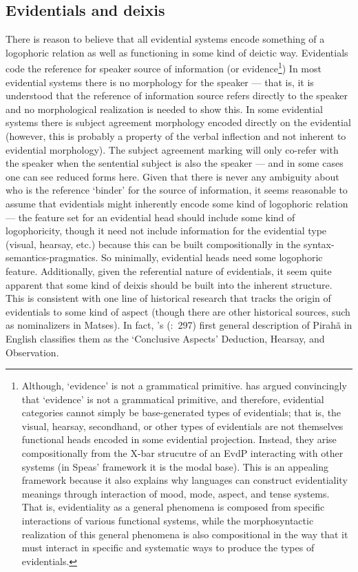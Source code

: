 \documentclass[11pt]{article}
\newcommand{\pgposscitet}[2]{\citeauthor{#1}'s (\citeyear{#1}:~#2)}
\begin{document}
\subsection{Evidentials and deixis} 
There is reason to believe that all evidential systems encode something of a logophoric relation as well as functioning in some kind of deictic way. Evidentials code the reference for speaker source of information (or evidence\footnote{Although, `evidence' is not a grammatical primitive. \cite{speas04evdparadigms,speas04evdlogophor,speas07evdfunctional,speas08synsemevd} has argued convincingly that `evidence' is not a grammatical primitive, and therefore, evidential categories cannot simply be base-generated types of evidentials; that is, the visual, hearsay, secondhand, or other types of evidentials are not themselves functional heads encoded in some evidential projection. Instead, they arise compositionally from the X-bar strucutre of an EvdP interacting with other systems (in Speas' framework it is the modal base). This is an appealing framework because it also explains why languages can construct evidentiality meanings through interaction of mood, mode, aspect, and tense systems. That is, evidentiality as a general phenomena is composed from specific interactions of various functional systems, while the morphosyntactic realization of this general phenomena is also compositional in the way that it must interact in specific and systematic ways to produce the types of evidentials.}) In most evidential systems there is no morphology for the speaker --- that is, it is understood that the reference of information source refers directly to the speaker and no morphological realization is needed to show this. In some evidential systems there is subject agreement morphology encoded directly on the evidential (however, this is probably a property of the verbal inflection and not inherent to evidential morphology). The subject agreement marking will only co-refer with the speaker when the sentential subject is also the speaker --- and in some cases one can see reduced forms here. Given that there is never any ambiguity about who is the reference `binder' for the source of information, it seems reasonable to assume that evidentials might inherently encode some kind of logophoric relation --- the feature set for an evidential head should include some kind of logophoricity, though it need not include information for the evidential type (visual, hearsay, etc.) because this can be built compositionally in the syntax-semantics-pragmatics. So minimally, evidential heads need some logophoric feature. Additionally, given the referential nature of evidentials, it seem quite apparent that some kind of deixis should be built into the inherent structure. This is consistent with one line of historical research that tracks the origin of evidentials to some kind of aspect (though there are other historical sources, such as nominalizers in Matses). In fact, \pgposscitet{everett86hal}{297} first general description of Pirah\~a in English classifies them as the `Conclusive Aspects' Deduction, Hearsay, and Observation. 
\end{document}
